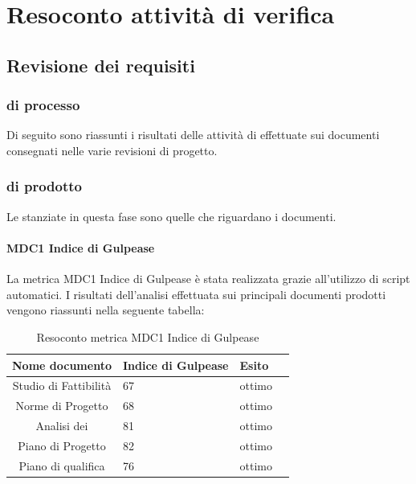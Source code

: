 \section{Resoconto attività di verifica}

\subsection{Revisione dei requisiti}

\subsubsection{ di processo}

Di seguito sono riassunti i risultati delle attività di  effettuate sui documenti consegnati nelle varie revisioni di progetto.

\subsubsection{ di prodotto}

Le  stanziate in questa fase sono quelle che riguardano i documenti.

\paragraph{MDC1 Indice di Gulpease}

La metrica MDC1 Indice di Gulpease è stata realizzata grazie all'utilizzo di script automatici. I risultati dell'analisi effettuata sui principali documenti prodotti vengono riassunti nella seguente tabella:

\begin{table}[H]
		\begin{center}
			\setlength{\aboverulesep}{0pt}
			\setlength{\belowrulesep}{0pt}
			\setlength{\extrarowheight}{.75ex}
			\begin{tabular}{ c C{4cm} C{2cm} C{3cm} }
				\textbf{Nome documento} & \textbf{Indice di Gulpease} & \textbf{Esito} \\
				\toprule
		Studio di Fattibilità & 67 & ottimo\\
		Norme di Progetto & 68 & ottimo\\
		Analisi dei  & 81 & ottimo\\
		Piano di Progetto & 82 & ottimo\\
		Piano di qualifica & 76 & ottimo\\
			
		\bottomrule
			\end{tabular}
			\caption{Resoconto metrica MDC1 Indice di Gulpease}
		\end{center}
	\end{table}

